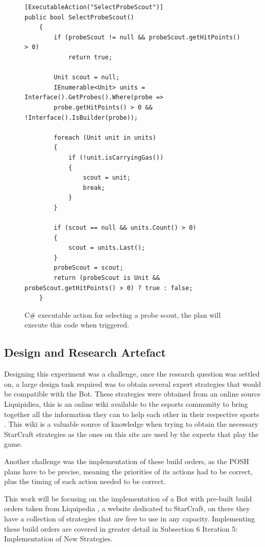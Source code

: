 \documentclass[journal]{IEEEtran}
\begin{document}
\begin{figure}
\begin{lstlisting}
[ExecutableAction("SelectProbeScout")]
public bool SelectProbeScout()
    {
        if (probeScout != null && probeScout.getHitPoints() > 0)
            return true;

        Unit scout = null;
        IEnumerable<Unit> units = Interface().GetProbes().Where(probe =>
        probe.getHitPoints() > 0 && !Interface().IsBuilder(probe));

        foreach (Unit unit in units)
        {
            if (!unit.isCarryingGas())
            {
                scout = unit;
                break;
            }
        }

        if (scout == null && units.Count() > 0)
        {
            scout = units.Last();
        }
        probeScout = scout;
        return (probeScout is Unit && probeScout.getHitPoints() > 0) ? true : false;
    }
\end{lstlisting}
\caption{C\# executable action for selecting a probe scout, the plan will execute this code when triggered.}
\label{Fi4}
\end{figure}
	
	\subsection{Design and Research Artefact}
	Designing this experiment was a challenge, once the research question was settled on, a large design task required was to obtain several expert strategies that would be compatible with the Bot. These strategies were obtained from an online source Liquipidiea, this is an online wiki available to the esports community to bring together all the information they can to help each other in their respective sports \cite{Liquid}. This wiki is a valuable source of knowledge when trying to obtain the necessary StarCraft strategies as the ones on this site are used by the experts that play the game. 
	
	Another challenge was the implementation of these build orders, as the POSH plans have to be precise, meaning the priorities of its actions had to be correct, plus the timing of each action needed to be correct. 
	
	This work will be focusing on the implementation of a Bot with pre-built build orders taken from Liquipedia \cite{Liquid}, a website dedicated to StarCraft, on there they have a collection of strategies that are free to use in any capacity. Implementing these build orders are covered in greater detail in Subsection 6 Iteration 5: Implementation of New Strategies.
	
\end{document}

